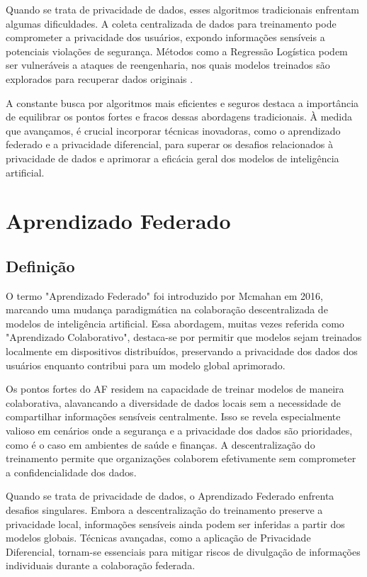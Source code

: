 Quando se trata de privacidade de dados, esses algoritmos tradicionais enfrentam algumas dificuldades. A coleta centralizada de dados para treinamento pode comprometer a privacidade dos usuários, expondo informações sensíveis a potenciais violações de segurança. Métodos como a Regressão Logística podem ser vulneráveis a ataques de reengenharia, nos quais modelos treinados são explorados para recuperar dados originais \cite{fredrikson2014privacy}.

A constante busca por algoritmos mais eficientes e seguros destaca a importância de equilibrar os pontos fortes e fracos dessas abordagens tradicionais. À medida que avançamos, é crucial incorporar técnicas inovadoras, como o aprendizado federado e a privacidade diferencial, para superar os desafios relacionados à privacidade de dados e aprimorar a eficácia geral dos modelos de inteligência artificial.

\section{Aprendizado Federado}
\label{sec:federado}

\subsection{Definição}

O termo "Aprendizado Federado" foi introduzido por Mcmahan em 2016, marcando uma mudança paradigmática na colaboração descentralizada de modelos de inteligência artificial\cite{mcmahan2017communication}. Essa abordagem, muitas vezes referida como "Aprendizado Colaborativo", destaca-se por permitir que modelos sejam treinados localmente em dispositivos distribuídos, preservando a privacidade dos dados dos usuários enquanto contribui para um modelo global aprimorado.

Os pontos fortes do AF residem na capacidade de treinar modelos de maneira colaborativa, alavancando a diversidade de dados locais sem a necessidade de compartilhar informações sensíveis centralmente. Isso se revela especialmente valioso em cenários onde a segurança e a privacidade dos dados são prioridades, como é o caso em ambientes de saúde e finanças. A descentralização do treinamento permite que organizações colaborem efetivamente sem comprometer a confidencialidade dos dados\cite{yang2019federated}.

Quando se trata de privacidade de dados, o Aprendizado Federado enfrenta desafios singulares. Embora a descentralização do treinamento preserve a privacidade local, informações sensíveis ainda podem ser inferidas a partir dos modelos globais. Técnicas avançadas, como a aplicação de Privacidade Diferencial, tornam-se essenciais para mitigar riscos de divulgação de informações individuais durante a colaboração federada\cite{geyer2017differentially}.


